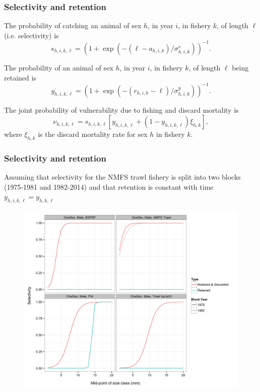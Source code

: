\documentclass{beamer}
\begin{document}

\begin{frame}
\frametitle{Selectivity and retention}

The probability of catching an animal of sex $h$, in year $i$, in fishery $k$,
of length $\ell$ (i.e. selectivity) is
\begin{equation*}
  s_{h,i,k,\ell} = (1 + \exp(-(\ell-a_{h,i,k})/\sigma_{h,i,k}^s))^{-1}.
\end{equation*}

The probability of an animal of sex $h$, in year $i$, in fishery $k$, of length
$\ell$ being retained is
\begin{equation*}
  y_{h,i,k,\ell} = (1 + \exp(-(r_{h,i,k}-\ell)/\sigma_{h,i,k}^y))^{-1}.
\end{equation*}

The joint probability of vulnerability due to fishing and discard mortality
is
\begin{equation*}
  \nu_{h,i,k,\ell} = s_{h,i,k,\ell} \left[ y_{h,i,k,\ell} + (1 - y_{h,i,k,\ell})
    \xi_{h,k} \right],
\end{equation*}
where $\xi_{h,k}$ is the discard mortality rate for sex $h$ in fishery
$k$.
\end{frame}


\begin{frame}
\frametitle{Selectivity and retention}
Assuming that selectivity for the NMFS trawl fishery is split into two blocks
(1975-1981 and 1982-2014) and that retention is constant with time
$y_{h,i,k,\ell} = y_{h,k,\ell}$
\begin{figure}[!htbp]
  \centering
  \includegraphics[width=0.6\linewidth]{../../examples/bbrkc/OneSex/figure/selectivity.png}
\end{figure}
\end{frame}
\end{document}
